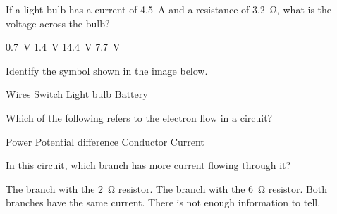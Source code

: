 \documentclass[]{exam}
\begin{document}
\begin{questions}
\question
If a light bulb has a current of \SI{4.5}{A} and a resistance of \SI{3.2}{\ohm}, what is the voltage across the bulb?

\begin{randomizechoices}
    \choice \SI{0.7}{V}
    \choice \SI{1.4}{V}
    \correctchoice \SI{14.4}{V}
    \choice \SI{7.7}{V}
\end{randomizechoices}


\question
Identify the symbol shown in the image below.

\begin{center}
\end{center}

\begin{randomizechoices}
    \choice Wires
    \choice Switch
    \choice Light bulb
    \correctchoice Battery 
\end{randomizechoices}

\question
Which of the following refers to the electron flow in a circuit?

\begin{randomizechoices}
    \choice Power
    \choice Potential difference
    \choice Conductor
    \correctchoice Current
\end{randomizechoices}

\question
In this circuit, which branch has more current flowing through it?

\begin{center}
\end{center}

\begin{randomizechoices}[keeplast]
    \correctchoice The branch with the \SI{2}{\ohm} resistor.
    \choice The branch with the \SI{6}{\ohm} resistor.
    \choice Both branches have the same current.
    \choice There is not enough information to tell.
\end{randomizechoices}



\end{questions}
\end{document}
